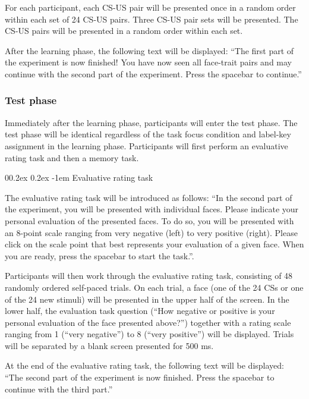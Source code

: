 \documentclass[
  doc,floatsintext]{apa6}
\makeatletter
\let\oldparagraph\paragraph
\renewcommand{\paragraph}[1]{\oldparagraph{#1}\mbox{}}
\renewcommand{\paragraph}{\@startsection{paragraph}{4}{\parindent}%
  {0\baselineskip \@plus 0.2ex \@minus 0.2ex}%
  {-1em}%
  {\normalfont\normalsize\bfseries\itshape\typesectitle}}
\makeatother
\begin{document}
For each participant, each CS-US pair will be presented once in a random order within each set of 24 CS-US pairs. Three CS-US pair sets will be presented. The CS-US pairs will be presented in a random order within each set.

After the learning phase, the following text will be displayed:
``The first part of the experiment is now finished!
You have now seen all face-trait pairs and may continue with the second part of the experiment.
Press the spacebar to continue.''

\hypertarget{test-phase}{%
\subsubsection{Test phase}\label{test-phase}}

Immediately after the learning phase, participants will enter the test phase. The test phase will be identical regardless of the task focus condition and label-key assignment in the learning phase. Participants will first perform an evaluative rating task and then a memory task.

\hypertarget{evaluative-rating-task}{%
\paragraph{Evaluative rating task}\label{evaluative-rating-task}}

The evaluative rating task will be introduced as follows:
``In the second part of the experiment, you will be presented with individual faces.
Please indicate your personal evaluation of the presented faces.
To do so, you will be presented with an 8-point scale ranging from very negative (left) to very positive (right).
Please click on the scale point that best represents your evaluation of a given face.
When you are ready, press the spacebar to start the task.''.

Participants will then work through the evaluative rating task, consisting of 48 randomly ordered self-paced trials. On each trial, a face (one of the 24 CSs or one of the 24 new stimuli) will be presented in the upper half of the screen. In the lower half, the evaluation task question (``How negative or positive is your personal evaluation of the face presented above?'') together with a rating scale ranging from 1 (``very negative'') to 8 (``very positive'') will be displayed.
Trials will be separated by a blank screen presented for 500 ms.

At the end of the evaluative rating task, the following text will be displayed:
``The second part of the experiment is now finished.
Press the spacebar to continue with the third part.''
\end{document}
